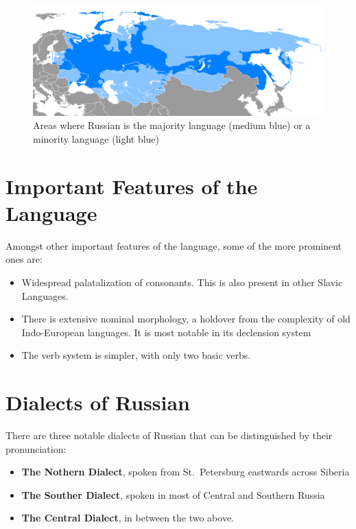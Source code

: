 \documentclass[
  a4paperpaper,
]{report}
\providecommand{\tightlist}{%
  \setlength{\itemsep}{0pt}\setlength{\parskip}{0pt}}
\begin{document}
\begin{figure}
\centering
\includegraphics{./Idioma_ruso.PNG}
\caption{Areas where Russian is the majority language (medium blue) or a
minority language (light blue)}
\end{figure}

\hypertarget{important-features-of-the-language}{%
\section{Important Features of the
Language}\label{important-features-of-the-language}}

Amongst other important features of the language, some of the more
prominent ones are:

\begin{itemize}
\tightlist
\item
  Widespread palatalization of consonants. This is also present in other
  Slavic Languages.
\item
  There is extensive nominal morphology, a holdover from the complexity
  of old Indo-European languages. It is most notable in its declension
  system
\item
  The verb system is simpler, with only two basic verbs.
\end{itemize}

\hypertarget{dialects-of-russian}{%
\section{Dialects of Russian}\label{dialects-of-russian}}

There are three notable dialects of Russian that can be distinguished by
their pronunciation:

\begin{itemize}
\tightlist
\item
  \textbf{The Nothern Dialect}, spoken from St.~Petersburg eastwards
  across Siberia
\item
  \textbf{The Souther Dialect}, spoken in most of Central and Southern
  Russia
\item
  \textbf{The Central Dialect}, in between the two above.
\end{itemize}
\end{document}
